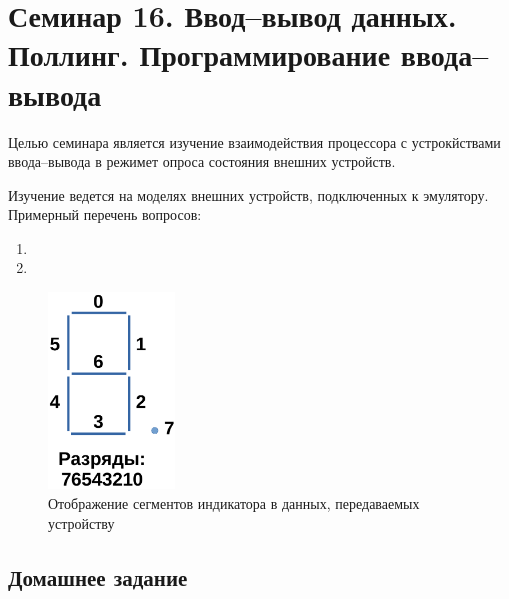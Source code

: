\chapter[16]{Семинар 16. Ввод--вывод данных. Поллинг. Программирование ввода--вывода}

Целью семинара является изучение взаимодействия процессора с устрокйствами ввода--вывода в режимет опроса состояния внешних устройств.

Изучение ведется на моделях внешних устройств, подключенных к эмулятору.
Примерный перечень вопросов:
\begin{enumerate}
    \item
    \item
\end{enumerate}

\begin{figure}[htbp]
    \centering
    \includegraphics[width=0.3\textwidth]{img/digit-control.png}
    \caption{Отображение сегментов индикатора в данных, передаваемых устройству}
    \label{digit-control}
\end{figure}

\section{Домашнее задание}

